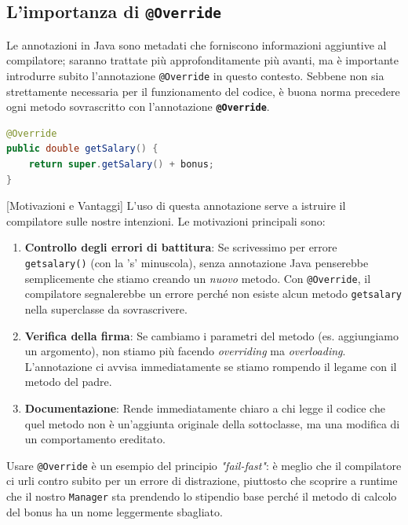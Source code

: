 \subsection{L'importanza di \texttt{@Override}}
Le annotazioni in Java sono metadati che forniscono informazioni aggiuntive al compilatore; saranno trattate più approfonditamente più avanti, ma è importante introdurre subito l'annotazione \texttt{@Override} in questo contesto.
Sebbene non sia strettamente necessaria per il funzionamento del codice, è buona norma precedere ogni metodo sovrascritto con l'annotazione \textbf{\texttt{@Override}}.

\begin{lstlisting}[language=Java, caption={Uso di @Override}]
@Override
public double getSalary() {
    return super.getSalary() + bonus;
}
\end{lstlisting}

[Motivazioni e Vantaggi]
L'uso di questa annotazione serve a istruire il compilatore sulle nostre intenzioni. Le motivazioni principali sono:
\begin{enumerate}
    \item \textbf{Controllo degli errori di battitura}: Se scrivessimo per errore \texttt{getsalary()} (con la 's' minuscola), senza annotazione Java penserebbe semplicemente che stiamo creando un \textit{nuovo} metodo. Con \texttt{@Override}, il compilatore segnalerebbe un errore perché non esiste alcun metodo \texttt{getsalary} nella superclasse da sovrascrivere.
    \item \textbf{Verifica della firma}: Se cambiamo i parametri del metodo (es. aggiungiamo un argomento), non stiamo più facendo \textit{overriding} ma \textit{overloading}. L'annotazione ci avvisa immediatamente se stiamo rompendo il legame con il metodo del padre.
    \item \textbf{Documentazione}: Rende immediatamente chiaro a chi legge il codice che quel metodo non è un'aggiunta originale della sottoclasse, ma una modifica di un comportamento ereditato.
\end{enumerate}



\begin{tip}
Usare \texttt{@Override} è un esempio del principio \textit{"fail-fast"}: è meglio che il compilatore ci urli contro subito per un errore di distrazione, piuttosto che scoprire a runtime che il nostro \texttt{Manager} sta prendendo lo stipendio base perché il metodo di calcolo del bonus ha un nome leggermente sbagliato.
\end{tip}

